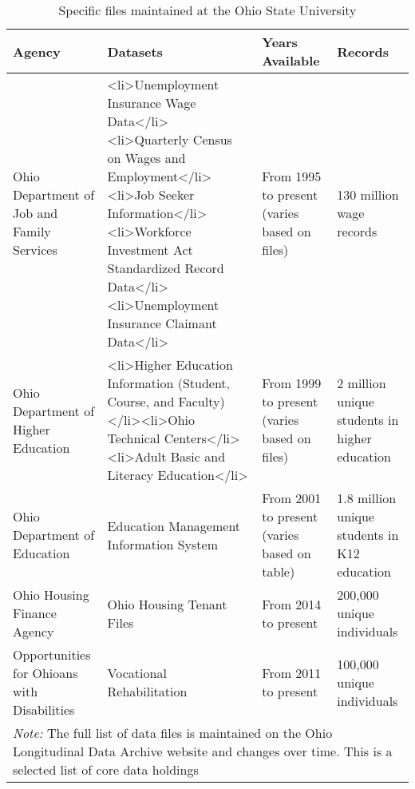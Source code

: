 \begin{table}

\caption{\label{tab:}Specific files maintained at the Ohio State University}
\centering
\begin{tabular}[t]{llll}
\toprule
Agency & Datasets & Years Available & Records\\
\midrule
Ohio Department of Job and Family Services & <li>Unemployment Insurance Wage Data</li><li>Quarterly Census on Wages and Employment</li><li>Job Seeker Information</li><li>Workforce Investment Act Standardized Record Data</li><li>Unemployment Insurance Claimant Data</li> & From 1995 to present (varies based on files) & 130 million wage records\\
Ohio Department of Higher Education & <li>Higher Education Information (Student, Course, and Faculty)</li><li>Ohio Technical Centers</li><li>Adult Basic and Literacy Education</li> & From 1999 to present (varies based on files) & 2 million unique students in higher education\\
Ohio Department of Education & Education Management Information System & From 2001 to present (varies based on table) & 1.8 million unique students in K12 education\\
Ohio Housing Finance Agency & Ohio Housing Tenant Files & From 2014 to present & 200,000 unique individuals\\
Opportunities for Ohioans with Disabilities & Vocational Rehabilitation & From 2011 to present & 100,000 unique individuals\\
\bottomrule
\multicolumn{4}{l}{\rule{0pt}{1em}\textit{Note: } The full list of data files is maintained on the Ohio Longitudinal Data Archive website and changes over time. This is a selected list of core data holdings}\\
\end{tabular}
\end{table}

